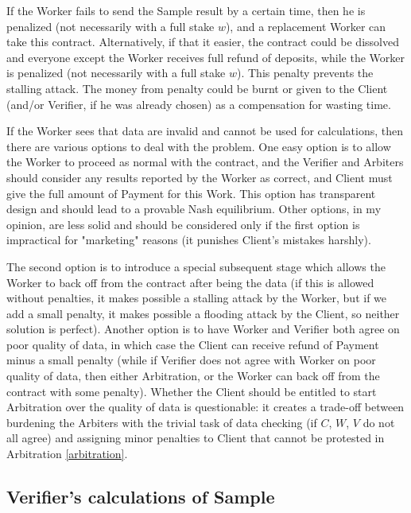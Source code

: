\documentclass[conference]{IEEEtran}
\begin{document}
If the Worker fails to send the Sample result by a certain time, then he is penalized (not necessarily with a full stake $w$), and a replacement Worker can take this contract. Alternatively, if that it easier, the contract could be dissolved and everyone except the Worker receives full refund of deposits, while the Worker is penalized (not necessarily with a full stake $w$). This penalty prevents the stalling attack. The money from penalty could be burnt or given to the Client (and/or Verifier, if he was already chosen) as a compensation for wasting time.

If the Worker sees that data are invalid and cannot be used for calculations, then there are various options to deal with the problem. One easy option is to allow the Worker to proceed as normal with the contract, and the Verifier and Arbiters should consider any results reported by the Worker as correct, and Client must give the full amount of Payment for this Work. This option has transparent design and should lead to a provable Nash equilibrium. Other options, in my opinion, are less solid and should be considered only if the first option is impractical for "marketing" reasons (it punishes Client's mistakes harshly).

The second option is to introduce a special subsequent stage which allows the Worker to back off from the contract after being the data (if this is allowed without penalties, it makes possible a stalling attack by the Worker, but if we add a small penalty, it makes possible a flooding attack by the Client, so neither solution is perfect). Another option is to have Worker and Verifier both agree on poor quality of data, in which case the Client can receive refund of Payment minus a small penalty (while if Verifier does not agree with Worker on poor quality of data, then either Arbitration, or the Worker can back off from the contract with some penalty). Whether the Client should be entitled to start Arbitration over the quality of data is questionable: it creates a trade-off between burdening the Arbiters with the trivial task of data checking (if $C$, $W$, $V$ do not all agree) and assigning minor penalties to Client that cannot be protested in Arbitration \ref{arbitration}.

\subsection{Verifier's calculations of Sample}
\label{verification}
\end{document}
